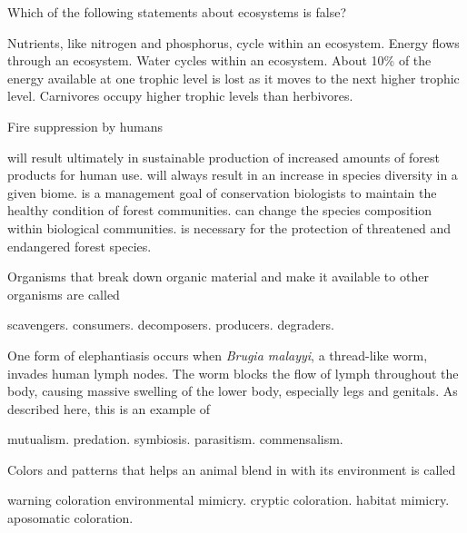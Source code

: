 
\question
Which of the following statements about ecosystems is false?

\begin{choices}
\choice Nutrients, like nitrogen and phosphorus, cycle within an ecosystem. 
\choice Energy flows through an ecosystem. 
\choice Water cycles within an ecosystem. 
\correctchoice About 10\% of the energy available at one trophic level is lost as it moves to the next higher trophic level. 
\choice Carnivores occupy higher trophic levels than herbivores. 
\end{choices}

\question
Fire suppression by humans

\begin{choices}
\choice will result ultimately in sustainable production of increased amounts of forest products for human use. 
\choice will always result in an increase in species diversity in a given biome. 
\choice is a management goal of conservation biologists to maintain the healthy condition of forest communities.
\correctchoice can change the species composition within biological communities. 
\choice is necessary for the protection of threatened and endangered forest species. 
\end{choices}

\question
Organisms that break down organic material and make it available to other organisms are called

\begin{choices}
\choice scavengers.
\choice consumers.
\correctchoice decomposers.
\choice producers.
\choice degraders.
\end{choices}


\question
One form of elephantiasis occurs when \textit{Brugia malayyi}, a thread-like worm, invades human lymph nodes. The worm blocks the flow of lymph throughout the body, causing massive swelling of the lower body, especially legs and genitals. As described here, this is an example of

\begin{choices}
\choice mutualism.
\choice predation.
\choice symbiosis.
\correctchoice parasitism.
\choice commensalism.
\end{choices}

\question
Colors and patterns that helps an animal blend in with its environment is called

\begin{choices}
\choice warning coloration 
\choice environmental mimicry. 
\correctchoice cryptic coloration. 
\choice habitat mimicry. 
\choice aposomatic coloration. 
\end{choices}

